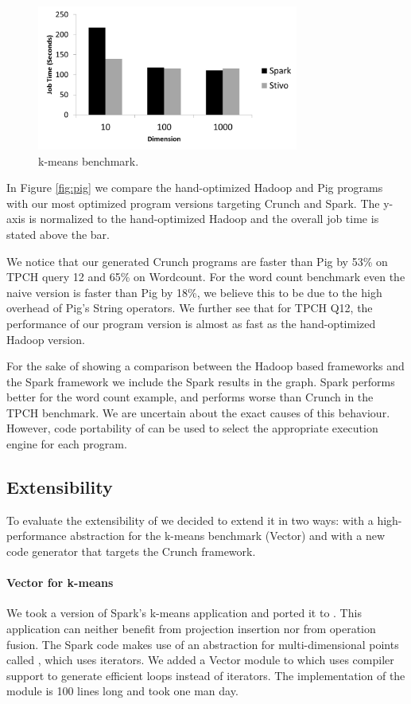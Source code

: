 \begin{figure}[t]
    \includegraphics[width=8.6cm]{figures/k-means}
   \caption{k-means benchmark.}
   \label{fig:k-means}%
\end{figure}

In Figure \ref{fig:pig} we compare the hand-optimized Hadoop and Pig programs
with our most optimized program versions targeting Crunch and Spark.
The y-axis is normalized to the hand-optimized Hadoop and the overall
job time is stated above the bar. 

We notice that our generated Crunch programs are faster than Pig by 53\% on
TPCH query 12 and 65\% on Wordcount. For the word count benchmark even the naive
version is faster than Pig by 18\%, we believe this to be due to the high
overhead of Pig's String operators. We further see that for TPCH Q12, the
performance of our program version is almost as fast as the hand-optimized
Hadoop version.

For the sake of showing a comparison between the Hadoop based frameworks
and the Spark framework we include the Spark results in the graph. Spark
performs better for the word count example, and performs worse than Crunch in
the TPCH benchmark. We are uncertain about the exact causes of this behaviour.
However, code portability of \tool can be used to select the appropriate
execution engine for each program. 

\subsection{Extensibility}
\label{subsec:kmeans}

To evaluate the extensibility of \tool we decided to extend it in two ways: 
with a high-performance abstraction for the k-means benchmark (Vector) and
with a new code generator that targets the Crunch framework.
 
\paragraph{Vector for k-means} 
We took a version of Spark's k-means \cite{spark-nsdi} application and
ported it to \tool. This application can neither benefit from projection
insertion nor from operation fusion. The Spark code makes use of an abstraction
for multi-dimensional points called , which uses iterators. We added
a Vector module to \tool which uses compiler support to generate efficient loops
instead of iterators. The implementation of the  module is 100
lines long and took one man day.

